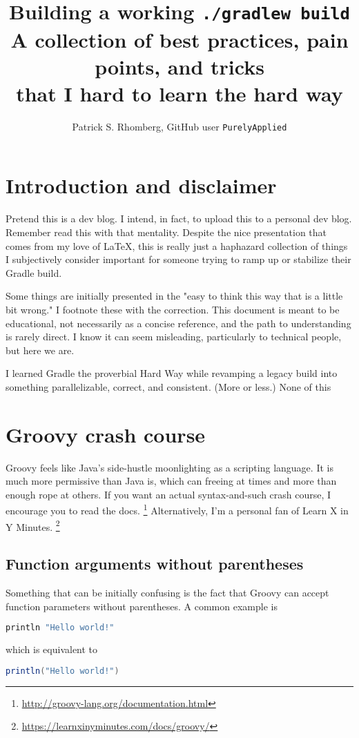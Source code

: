 \documentclass[]{article}
\title{Building a working \texttt{./gradlew build}  \large \\
  A collection of best practices, pain points, and tricks \\
  that I hard to learn the hard way}
\author{Patrick S. Rhomberg, GitHub user \texttt{PurelyApplied}}
\theoremstyle{definition}
\begin{document}
\maketitle
\tableofcontents


\section{Introduction and disclaimer}

Pretend this is a dev blog.
I intend, in fact, to upload this to a personal dev blog.
Remember read this with that mentality.
Despite the nice presentation that comes from my love of \LaTeX, 
this is really just a haphazard collection of things I subjectively consider important for someone trying to ramp up or stabilize their Gradle build.

Some things are initially presented in the "easy to think this way that is a little bit wrong."
I footnote these with the correction.
This document is meant to be educational, not necessarily as a concise reference, and the path to understanding is rarely direct.
I know it can seem misleading, particularly to technical people, but here we are.

I learned Gradle the proverbial Hard Way while revamping a legacy build into something parallelizable, correct, and consistent.
(More or less.)
None of this 

\section{Groovy crash course}

Groovy feels like Java's side-hustle moonlighting as a scripting language.
It is much more permissive than Java is, which can freeing at times and more than enough rope at others.
If you want an actual syntax-and-such crash course, I encourage you to read the docs.
\footnote{\url{http://groovy-lang.org/documentation.html}}%
Alternatively, I'm a personal fan of Learn X in Y Minutes.%
\footnote{\url{https://learnxinyminutes.com/docs/groovy/}}

\subsection{Function arguments without parentheses}

Something that can be initially confusing is the fact that Groovy can accept function parameters without parentheses.
A common example is 

\begin{lstlisting}[language=Groovy]
println "Hello world!"
\end{lstlisting}
which is equivalent to 
\begin{lstlisting}[language=Groovy]
println("Hello world!")
\end{lstlisting}
\end{document}
